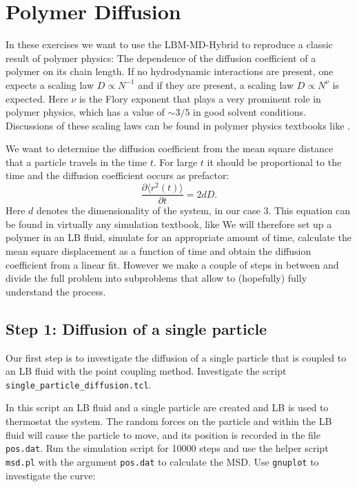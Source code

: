 
\chapter{Polymer Diffusion}
In these exercises we want to use the LBM-MD-Hybrid to reproduce a classic
result of polymer physics: The dependence of the diffusion coefficient
of a polymer on its chain length. If no hydrodynamic interactions
are present, one expects a scaling law $D \propto N^{-1}$ and if 
they are present, a scaling law $D \propto N^{\nu}$ is expected. 
Here $\nu$ is the Flory exponent that plays a very prominent role
in polymer physics, which has a value of $\sim 3/5$ in good solvent
conditions. Discussions of these scaling laws can be found
in polymer physics textbooks like \cite{degennes, doi, rubinstein}.


We want to determine the diffusion coefficient from the mean square
distance that a particle travels in the time $t$. For large $t$ it should
be proportional to the time and the diffusion coefficient occurs as 
prefactor: 
\begin{equation}
  \frac{\partial \langle r^2 \left(t\right)\rangle}{\partial t} = 2 d D. 
  \label{eq:msd}
\end{equation}
Here $d$ denotes the dimensionality of the system, in our case 3.
This equation can be found in virtually any simulation textbook, like
\cite{frenkel}
We will therefore set up a polymer in an LB fluid, simulate for an appropriate
amount of time, calculate the mean square displacement as a function of
time and obtain the diffusion coefficient from a linear fit. However
we make a couple of steps in between and divide the full problem into 
subproblems that allow to (hopefully) fully understand the process.

\section{Step 1: Diffusion of a single particle}
Our first step is to investigate the diffusion of a single particle
that is coupled to an LB fluid with the point coupling method.
Investigate the script  \lstinline|single_particle_diffusion.tcl|.

In this script an LB fluid and a single particle are created and LB is
used to thermostat the system. The random forces on the particle and
within the LB fluid will cause the particle to move, and its position
is recorded in the file \lstinline|pos.dat|. Run the simulation script
for 10000 steps and use the helper script \lstinline|msd.pl| with the
argument \lstinline|pos.dat| to calculate the MSD. Use
\lstinline|gnuplot| to investigate the curve:

